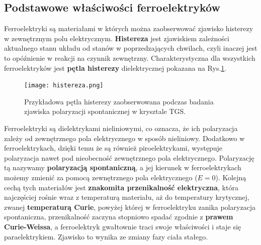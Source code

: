 \documentclass{article}
\begin{document}
\subsection{Podstawowe właściwości ferroelektryków}
Ferroelektryki są materiałami w których można zaobserwować zjawisko histerezy w zewnętrznym polu elektrycznym\cite{histereza}. \textbf{Histereza} jest zjawiskiem zależności aktualnego stanu układu od stanów w poprzedzających chwilach, czyli inaczej jest to opóźnienie w reakcji na czynnik zewnętrzny. Charakterystyczna dla wszystkich ferroelektryków jest \textbf{pętla histerezy} dielektrycznej pokazana na Rys.\ref{fig:histereza}.

\begin{figure}[!h]
	\centering
	\texttt{[image: histereza.png]}
	\caption{Przykładowa pętla histerezy zaobserwowana podczas badania zjawiska polaryzacji spontanicznej w krysztale TGS.}
	\label{fig:histereza}
\end{figure}

Ferroelektryki są dielektrykami nieliniowymi, co oznacza, że ich polaryzacja zależy od zewnętrznego pola elektrycznego w sposób nieliniowy. Dodatkowo w ferroelektrykach, dzięki temu że są również piroelektrykami, występuje polaryzacja nawet pod nieobecność zewnętrznego pola elektrycznego. Polaryzację tą nazywamy \textbf{polaryzacją spontaniczną}, a jej kierunek w ferroelektrykach możemy zmienić za pomocą zewnętrznego pola elektrycznego ($E=0$). Kolejną cechą tych materiałów jest \textbf{znakomita przenikalność elektryczna}, która najczęściej rośnie wraz z temperaturą materiału, aż do temperatury krytycznej, zwanej \textbf{temperaturą Curie}, powyżej której w ferroelektryku zanika polaryzacja spontaniczna, przenikalność zaczyna stopniowo spadać zgodnie z \textbf{prawem Curie-Weissa}\cite{krajewski}, a ferroelektryk gwałtownie traci swoje właściwości i staje się paraelektrykiem. Zjawisko to wynika ze zmiany fazy ciała stałego.
\end{document}
